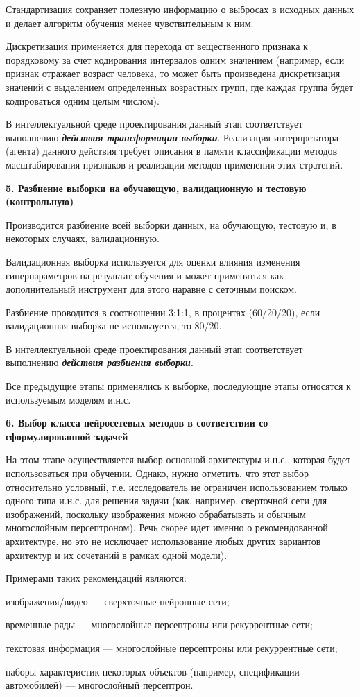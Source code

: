 Стандартизация сохраняет полезную информацию о выбросах в исходных данных и делает алгоритм обучения менее чувствительным к ним.

Дискретизация применяется для перехода от вещественного признака к порядковому за счет кодирования интервалов одним значением (например, если признак отражает возраст человека, то может быть произведена дискретизация значений с выделением определенных возрастных групп, где каждая группа будет кодироваться одним целым числом).

В интеллектуальной среде проектирования данный этап соответствует выполнению \textbf{\textit{действия трансформации выборки}}. Реализация интерпретатора (агента) данного действия требует описания в памяти классификации методов масштабирования признаков и реализации методов применения этих стратегий.


\textbf{5. Разбиение выборки на обучающую, валидационную и тестовую (контрольную)}

Производится разбиение всей выборки данных, на обучающую, тестовую и, в некоторых случаях, валидационную.

Валидационная выборка используется для оценки влияния изменения гиперпараметров на результат обучения и может применяться как дополнительный инструмент для этого наравне с сеточным поиском.

Разбиение проводится в соотношении 3:1:1, в процентах (60/20/20), если валидационная выборка не используется, то 80/20.

В интеллектуальной среде проектирования данный этап соответствует выполнению \textbf{\textit{действия разбиения выборки}}.

Все предыдущие этапы применялись к выборке, последующие этапы относятся к используемым моделям и.н.с.


\textbf{6. Выбор класса нейросетевых методов в соответствии со сформулированной задачей}

На этом этапе осуществляется выбор основной архитектуры и.н.с., которая будет использоваться при обучении. Однако, нужно отметить, что этот выбор относительно условный, т.е. исследователь не ограничен использованием только одного типа и.н.с. для решения задачи (как, например, сверточной сети для изображений, поскольку изображения можно обрабатывать и обычным многослойным персептроном). Речь скорее идет именно о рекомендованной архитектуре, но это не исключает использование любых других вариантов архитектур и их сочетаний в рамках одной модели).

Примерами таких рекомендаций являются:
\begin{textitemize}
	\item изображения/видео --- сверхточные нейронные сети;
	\item временные ряды --- многослойные персептроны или рекуррентные сети;
	\item текстовая информация --- многослойные персептроны или рекуррентные сети;
	\item наборы характеристик некоторых объектов (например, спецификации автомобилей) --- многослойный персептрон.
\end{textitemize}

